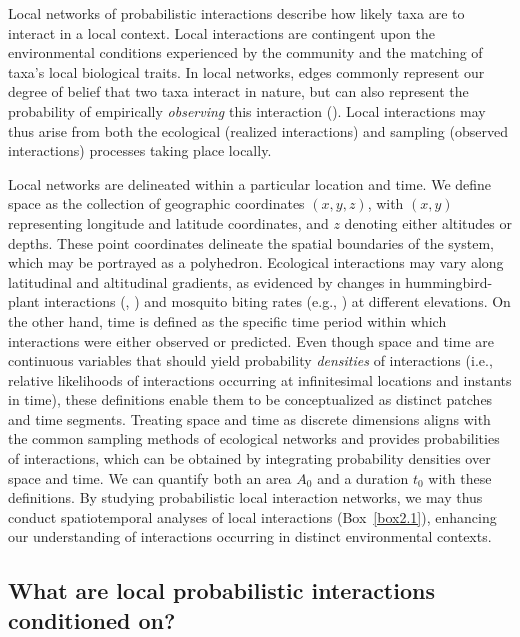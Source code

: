 Local networks of probabilistic interactions describe how likely taxa are to
interact in a local context. Local interactions are contingent upon the
environmental conditions experienced by the community and the matching of taxa's
local biological traits. In local networks, edges commonly represent our degree
of belief that two taxa interact in nature, but can also represent the
probability of empirically \textit{observing} this interaction
(\cite{Catchen2023Missinga}). Local interactions may thus arise from both the
ecological (realized interactions) and sampling (observed interactions)
processes taking place locally.

Local networks are delineated within a particular location and time. We define
space as the collection of geographic coordinates $(x, y, z)$, with $(x, y)$
representing longitude and latitude coordinates, and $z$ denoting either
altitudes or depths. These point coordinates delineate the spatial boundaries of
the system, which may be portrayed as a polyhedron. Ecological interactions may
vary along latitudinal and altitudinal gradients, as evidenced by changes in
hummingbird-plant interactions (\cite{Weinstein2017Comparing},
\cite{Weinstein2017Persistent}) and mosquito biting rates (e.g.,
\cite{Kulkarni2006Entomological}) at different elevations. On the other hand,
time is defined as the specific time period within which interactions were
either observed or predicted. Even though space and time are continuous
variables that should yield probability \textit{densities} of interactions
(i.e., relative likelihoods of interactions occurring at infinitesimal locations
and instants in time), these definitions enable them to be conceptualized as
distinct patches and time segments. Treating space and time as discrete
dimensions aligns with the common sampling methods of ecological networks and
provides probabilities of interactions, which can be obtained by integrating
probability densities over space and time. We can quantify both an area $A_0$
and a duration $t_0$ with these definitions. By studying probabilistic local
interaction networks, we may thus conduct spatiotemporal analyses of local
interactions (Box~\ref{box2.1}), enhancing our understanding of interactions
occurring in distinct environmental contexts. 

\subsection{What are local probabilistic interactions conditioned on?}

